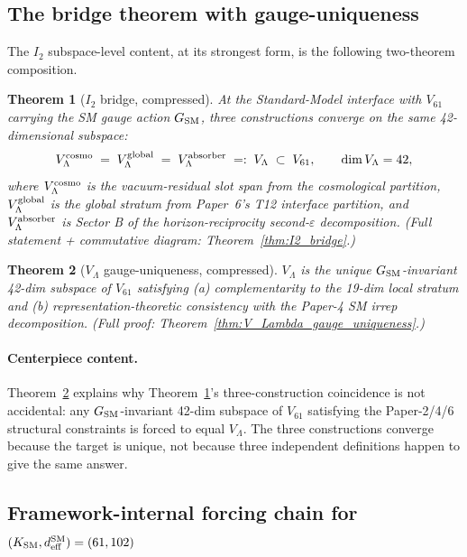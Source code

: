 \documentclass[11pt]{article}
\theoremstyle{plain}
\newtheorem{theorem}{Theorem}[section]
\theoremstyle{definition}
\theoremstyle{remark}
\begin{document}
\bigskip

\subsection{The bridge theorem with gauge-uniqueness}\label{supp:O_bridge}

The $I_2$ subspace-level content, at its strongest form, is the following two-theorem composition.

\begin{theorem}[$I_2$ bridge, compressed]\label{thm:O_bridge}
At the Standard-Model interface with $V_{61}$ carrying the SM gauge action $G_{\rm SM}$, three constructions converge on the same 42-dimensional subspace:
\[
  V_\Lambda^{\rm cosmo} \;=\; V_\Lambda^{\rm global} \;=\; V_\Lambda^{\rm absorber} \;=:\; V_\Lambda \;\subset\; V_{61}, \qquad \dim V_\Lambda = 42,
\]
where $V_\Lambda^{\rm cosmo}$ is the vacuum-residual slot span from the cosmological partition, $V_\Lambda^{\rm global}$ is the global stratum from Paper~6's T12 interface partition, and $V_\Lambda^{\rm absorber}$ is Sector B of the horizon-reciprocity second-$\varepsilon$ decomposition.  (Full statement + commutative diagram: Theorem~\ref{thm:I2_bridge}.)
\end{theorem}

\begin{theorem}[$V_\Lambda$ gauge-uniqueness, compressed]\label{thm:O_uniqueness}
$V_\Lambda$ is the unique $G_{\rm SM}$-invariant 42-dim subspace of $V_{61}$ satisfying (a) complementarity to the 19-dim local stratum and (b) representation-theoretic consistency with the Paper-4 SM irrep decomposition.  (Full proof: Theorem~\ref{thm:V_Lambda_gauge_uniqueness}.)
\end{theorem}

\paragraph{Centerpiece content.}  Theorem~\ref{thm:O_uniqueness} explains why Theorem~\ref{thm:O_bridge}'s three-construction coincidence is not accidental: any $G_{\rm SM}$-invariant 42-dim subspace of $V_{61}$ satisfying the Paper-2/4/6 structural constraints is forced to equal $V_\Lambda$.  The three constructions converge because the target is unique, not because three independent definitions happen to give the same answer.

\bigskip

\subsection{Framework-internal forcing chain for $(K_{\rm SM}, d_{\rm eff}^{\rm SM}) = (61, 102)$}\label{supp:O_forcing}
\end{document}
